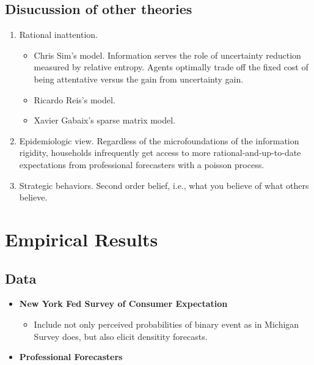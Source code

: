 \documentclass[]{article}
\begin{document}
\subsection{Disucussion of other theories}

\begin{enumerate}
\item Rational inattention. 
\begin{itemize}
	\item Chris Sim's model.\cite{sims2003implications} Information serves the role of uncertainty reduction measured by relative entropy. Agents optimally trade off the fixed cost of being attentative versus the gain from uncertainty gain.   
	\item Ricardo Reis's model. \cite{reis2006inattentive}
	\item Xavier Gabaix's sparse matrix model. \cite{gabaix2014sparsity}
\end{itemize}

\item Epidemiologic view. \cite{carroll2003macroeconomic} Regardless of the microfoundations of the information rigidity, households infrequently get access to more rational-and-up-to-date expectations from professional forecasters with a poisson process. 


\item Strategic behaviors. Second order belief, i.e., what you believe of what others believe. \cite{angeletos2009incomplete}



\end{enumerate}

\section{Empirical Results}

\subsection{Data}

\begin{itemize}
	
		\item \textbf{New York Fed Survey of Consumer Expectation}
	\begin{itemize}
			\item Include not only perceived probabilities of binary event as in Michigan Survey does, but also elicit densitity forecasts. 
	\end{itemize}
	\item \textbf{Professional Forecasters}

\end{itemize}
\end{document}
